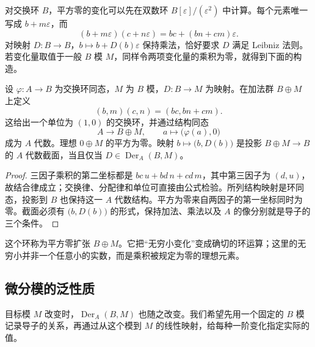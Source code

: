 对交换环 \(B\)，平方零的变化可以先在双数环 \(B[\varepsilon]/(\varepsilon^2)\) 中计算。每个元素唯一写成 \(b+m\varepsilon\)，而
\[
	(b+m\varepsilon)(c+n\varepsilon)=bc+(bn+cm)\varepsilon.
\]
对映射 \(D:B\to B\)，\(b\mapsto b+D(b)\varepsilon\) 保持乘法，恰好要求 \(D\) 满足 Leibniz 法则。若变化量取值于一般 \(B\) 模 \(M\)，同样令两项变化量的乘积为零，就得到下面的构造。

\begin{proposition}\label{b3:prop:derivation-square-zero}
	设 \(\varphi:A\to B\) 为交换环同态，\(M\) 为 \(B\) 模，\(D:B\to M\) 为映射。在加法群 \(B\oplus M\) 上定义
	\[
		(b,m)(c,n)=(bc,bn+cm).
	\]
	这给出一个单位为 \((1,0)\) 的交换环，并通过结构同态
	\[
		A\longrightarrow B\oplus M,\qquad a\longmapsto\bigl(\varphi(a),0\bigr)
	\]
	成为 \(A\) 代数。理想 \(0\oplus M\) 的平方为零。映射 \(b\mapsto\bigl(b,D(b)\bigr)\) 是投影 \(B\oplus M\to B\) 的 \(A\) 代数截面，当且仅当 \(D\in\operatorname{Der}_A(B,M)\)。
\end{proposition}
\begin{proof}
	三因子乘积的第二坐标都是 \(bc\,u+b d\,n+c d\,m\)，其中第三因子为 \((d,u)\)，故结合律成立；交换律、分配律和单位可直接由公式检验。所列结构映射是环同态，投影到 \(B\) 也保持这一 \(A\) 代数结构。平方为零来自两因子的第一坐标同时为零。截面必须有 \(\bigl(b,D(b)\bigr)\) 的形式，保持加法、乘法以及 \(A\) 的像分别就是导子的三个条件。
\end{proof}

这个环称为平方零扩张 \(B\oplus M\)。它把“无穷小变化”变成确切的环运算；这里的无穷小并非一个任意小的实数，而是乘积被规定为零的理想元素。

\subsection{微分模的泛性质}
\label{b3:subsec:1401:02}

目标模 \(M\) 改变时，\(\operatorname{Der}_A(B,M)\) 也随之改变。我们希望先用一个固定的 \(B\) 模记录导子的关系，再通过从这个模到 \(M\) 的线性映射，给每种一阶变化指定实际的值。

